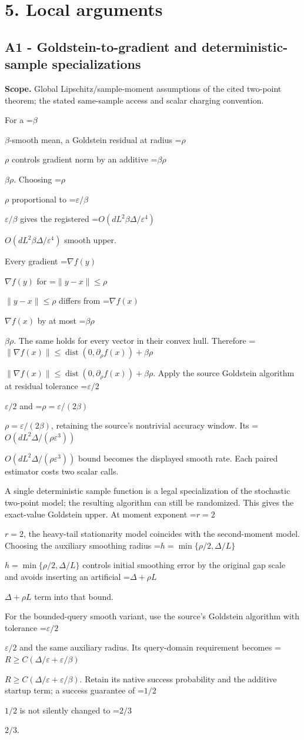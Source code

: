 \documentclass[10pt,a4paper]{article}
\newcommand{\AtlasMath}[1]{\par\begingroup\centering\setbox0=\hbox{$\displaystyle #1$}\ifdim\wd0>1.4\linewidth\typeout{ATLAS WIDE FORMULA: \the\wd0}\fi\ifdim\wd0>\linewidth\resizebox{\linewidth}{!}{\box0}\else\box0\fi\par\endgroup}
\newcommand{\AtlasInlineMath}[1]{\begingroup\setbox0=\hbox{$#1$}\ifdim\wd0>.4\linewidth\endgroup\AtlasMath{#1}\else\endgroup$#1$\fi}
\begin{document}
\section{5. Local arguments}
\subsection{A1 - Goldstein-to-gradient and deterministic-sample specializations}
\textbf{Scope.} Global Lipschitz/sample-moment assumptions of the cited two-point theorem; the stated same-sample access and scalar charging convention.

For a \AtlasInlineMath{\beta}-smooth mean, a Goldstein residual at radius \AtlasInlineMath{\rho} controls gradient norm by an additive \AtlasInlineMath{\beta\rho}. Choosing \AtlasInlineMath{\rho} proportional to \AtlasInlineMath{\varepsilon/\beta} gives the registered \AtlasInlineMath{O(dL^2\beta\Delta/\varepsilon^4)} smooth upper.

Every gradient \AtlasInlineMath{\nabla f(y)} for \AtlasInlineMath{\|y-x\|\le\rho} differs from \AtlasInlineMath{\nabla f(x)} by at most \AtlasInlineMath{\beta\rho}. The same holds for every vector in their convex hull. Therefore \AtlasInlineMath{\|\nabla f(x)\|\le\operatorname{dist}(0,\partial_\rho f(x))+\beta\rho}. Apply the source Goldstein algorithm at residual tolerance \AtlasInlineMath{\varepsilon/2} and \AtlasInlineMath{\rho=\varepsilon/(2\beta)}, retaining the source's nontrivial accuracy window. Its \AtlasInlineMath{O(dL^2\Delta/(\rho\varepsilon^3))} bound becomes the displayed smooth rate. Each paired estimator costs two scalar calls.

A single deterministic sample function is a legal specialization of the stochastic two-point model; the resulting algorithm can still be randomized. This gives the exact-value Goldstein upper. At moment exponent \AtlasInlineMath{r=2}, the heavy-tail stationarity model coincides with the second-moment model. Choosing the auxiliary smoothing radius \AtlasInlineMath{h=\min\{\rho/2,\Delta/L\}} controls initial smoothing error by the original gap scale and avoids inserting an artificial \AtlasInlineMath{\Delta+\rho L} term into that bound.

For the bounded-query smooth variant, use the source's Goldstein algorithm with tolerance \AtlasInlineMath{\varepsilon/2} and the same auxiliary radius. Its query-domain requirement becomes \AtlasInlineMath{R\ge C(\Delta/\varepsilon+\varepsilon/\beta)}. Retain its native success probability and the additive startup term; a success guarantee of \AtlasInlineMath{1/2} is not silently changed to \AtlasInlineMath{2/3}.
\end{document}
